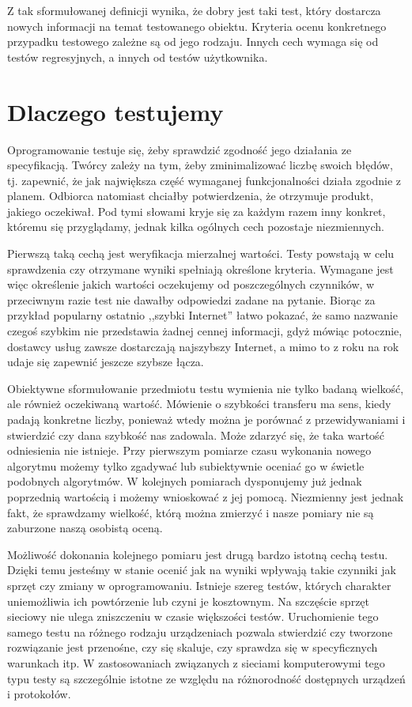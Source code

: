 \documentclass[00-praca-magisterska.tex]{subfiles}
\begin{document}
Z tak sformułowanej definicji wynika, że dobry jest taki test, który dostarcza
nowych informacji na temat testowanego obiektu. Kryteria ocenu konkretnego
przypadku testowego zależne są od jego rodzaju. Innych cech wymaga się od
testów regresyjnych, a innych od testów użytkownika.

\section{Dlaczego testujemy}
\label{dlaczego-testujemy}

Oprogramowanie testuje się, żeby sprawdzić zgodność jego działania ze
specyfikacją. Twórcy zależy na tym, żeby zminimalizować liczbę swoich błędów,
tj. zapewnić, że jak największa część wymaganej funkcjonalności działa zgodnie
z planem. Odbiorca natomiast chciałby potwierdzenia, że otrzymuje produkt,
jakiego oczekiwał. Pod tymi słowami kryje się za każdym razem inny konkret,
któremu się przyglądamy, jednak kilka ogólnych cech pozostaje niezmiennych.

Pierwszą taką cechą jest weryfikacja mierzalnej wartości. Testy powstają w celu
sprawdzenia czy otrzymane wyniki spełniają określone kryteria. Wymagane jest
więc określenie jakich wartości oczekujemy od poszczególnych czynników, w
przeciwnym razie test nie dawałby odpowiedzi zadane na pytanie. Biorąc za
przykład popularny ostatnio ,,szybki Internet'' łatwo pokazać, że samo nazwanie
czegoś szybkim nie przedstawia żadnej cennej informacji, gdyż mówiąc potocznie,
dostawcy usług zawsze dostarczają najszybszy Internet, a mimo to z roku na rok
udaje się zapewnić jeszcze szybsze łącza. 

Obiektywne sformułowanie przedmiotu testu wymienia nie tylko badaną wielkość,
ale również oczekiwaną wartość. Mówienie o szybkości transferu ma sens, kiedy
padają konkretne liczby, ponieważ wtedy można je porównać z przewidywaniami i
stwierdzić czy dana szybkość nas zadowala. Może zdarzyć się, że taka wartość
odniesienia nie istnieje. Przy pierwszym pomiarze czasu wykonania nowego
algorytmu możemy tylko zgadywać lub subiektywnie oceniać go w świetle podobnych
algorytmów. W kolejnych pomiarach dysponujemy już jednak poprzednią wartością i
możemy wnioskować z jej pomocą. Niezmienny jest jednak fakt, że sprawdzamy
wielkość, którą można zmierzyć i nasze pomiary nie są zaburzone naszą osobistą
oceną.

Możliwość dokonania kolejnego pomiaru jest drugą bardzo istotną cechą testu.
Dzięki temu jesteśmy w stanie ocenić jak na wyniki wpływają takie czynniki jak
sprzęt czy zmiany w oprogramowaniu. Istnieje szereg testów, których charakter
uniemożliwia ich powtórzenie lub czyni je kosztownym. Na szczęście sprzęt
sieciowy nie ulega zniszczeniu w czasie większości testów. Uruchomienie tego
samego testu na różnego rodzaju urządzeniach pozwala stwierdzić czy tworzone
rozwiązanie jest przenośne, czy się skaluje, czy sprawdza się w specyficznych
warunkach itp. W zastosowaniach związanych z sieciami komputerowymi tego typu
testy są szczególnie istotne ze względu na różnorodność dostępnych urządzeń i
protokołów.
\end{document}
